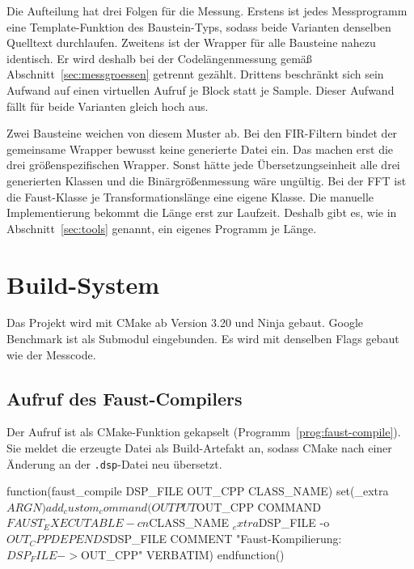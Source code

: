 Die Aufteilung hat drei Folgen für die Messung. Erstens ist jedes Messprogramm eine Template-Funktion des Baustein-Typs, sodass beide Varianten denselben Quelltext durchlaufen. Zweitens ist der Wrapper für alle Bausteine nahezu identisch. Er wird deshalb bei der Codelängenmessung gemäß Abschnitt~\ref{sec:messgroessen} getrennt gezählt. Drittens beschränkt sich sein Aufwand auf einen virtuellen Aufruf je Block statt je Sample. Dieser Aufwand fällt für beide Varianten gleich hoch aus.

Zwei Bausteine weichen von diesem Muster ab. Bei den FIR-Filtern bindet der gemeinsame Wrapper bewusst keine generierte Datei ein. Das machen erst die drei größenspezifischen Wrapper. Sonst hätte jede Übersetzungseinheit alle drei generierten Klassen und die Binärgrößenmessung wäre ungültig. Bei der FFT ist die Faust-Klasse je Transformationslänge eine eigene Klasse. Die manuelle Implementierung bekommt die Länge erst zur Laufzeit. Deshalb gibt es, wie in Abschnitt~\ref{sec:tools} genannt, ein eigenes Programm je Länge.

\section{Build-System}
\label{sec:build}

Das Projekt wird mit CMake ab Version 3.20 und Ninja gebaut. Google Benchmark ist als Submodul eingebunden. Es wird mit denselben Flags gebaut wie der Messcode.

\subsection{Aufruf des Faust-Compilers}
\label{subsec:faust-aufruf}

Der Aufruf ist als CMake-Funktion gekapselt (Programm~\ref{prog:faust-compile}). Sie meldet die erzeugte Datei als Build-Artefakt an, sodass CMake nach einer Änderung an der \texttt{.dsp}-Datei neu übersetzt.

\begin{program}
	\caption{Einbindung des Faust-Compilers in das Build-System}
	\label{prog:faust-compile}
	\begin{CCode}
		function(faust_compile DSP_FILE OUT_CPP CLASS_NAME)
		set(_extra ${ARGN})
		add_custom_command(
		OUTPUT ${OUT_CPP}
		COMMAND ${FAUST_EXECUTABLE} -cn ${CLASS_NAME} ${_extra}
		${DSP_FILE} -o ${OUT_CPP}
		DEPENDS ${DSP_FILE}
		COMMENT "Faust-Kompilierung: ${DSP_FILE} -> ${OUT_CPP}"
		VERBATIM)
		endfunction()
	\end{CCode}
\end{program}

